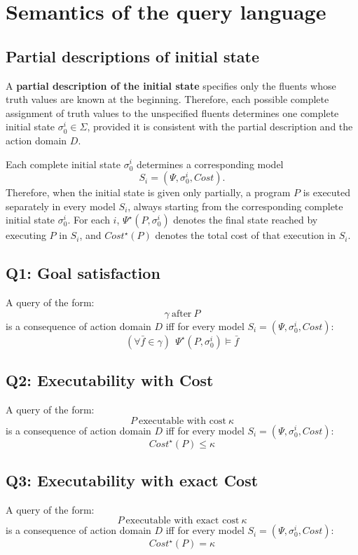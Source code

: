 \documentclass[11pt]{article}
\newcommand{\states}{\Sigma}
\begin{document}
\section{Semantics of the query language}

\subsection{Partial descriptions of initial state}

A \textbf{partial description of the initial state} specifies only the fluents whose truth values are
known at the beginning. Therefore, each possible complete assignment of truth values to the
unspecified fluents determines one complete initial state \(\sigma_0^i \in \states\), provided it is
consistent with the partial description and the action domain \(D\).

Each complete initial state \(\sigma_0^i\) determines a corresponding model
\[
S_i=(\Psi, \sigma_0^i, Cost).
\]
Therefore, when the initial state is given only partially, a program \(P\) is executed separately in
every model \(S_i\), always starting from the corresponding complete initial state \(\sigma_0^i\).
For each \(i\), \(\Psi^\star(P, \sigma_0^i)\) denotes the final state reached by executing \(P\) in
\(S_i\), and \(Cost^\star(P)\) denotes the total cost of that execution in \(S_i\).

\subsection*{Q1: Goal satisfaction}
A query of the form:
\[\gamma ~\text{after}~ P\]
is a consequence of action domain \(D\) iff for every model \(S_i=(\Psi, \sigma_0^i, Cost)\):
\[
(\forall \bar{f}\in\gamma)~~ \Psi^\star(P, \sigma_0^i) \models \bar{f}
\]

\subsection*{Q2: Executability with Cost}
A query of the form:
\[P ~\text{executable with cost}~ \kappa\]
is a consequence of action domain \(D\) iff for every model \(S_i=(\Psi, \sigma_0^i, Cost)\):
\[
Cost^\star(P) \leq \kappa
\]

\subsection*{Q3: Executability with exact Cost}
A query of the form:
\[P ~\text{executable with exact cost}~ \kappa\]
is a consequence of action domain \(D\) iff for every model \(S_i=(\Psi, \sigma_0^i, Cost)\):
\[
Cost^\star(P) = \kappa
\]
\end{document}
